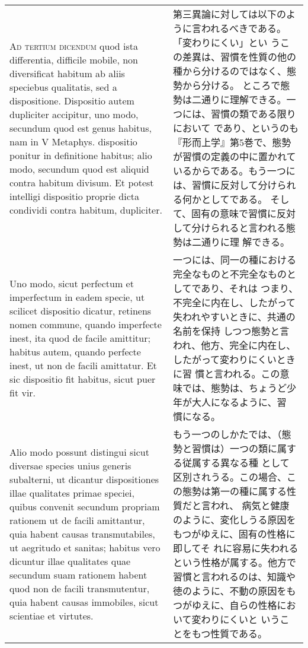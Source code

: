 \documentclass[10pt]{jsarticle} %
\begin{document}
\begin{longtable}{p{21em}p{21em}}
\\



{\scshape Ad tertium dicendum} quod ista differentia, difficile mobile, non
diversificat habitum ab aliis speciebus qualitatis, sed a
dispositione. Dispositio autem dupliciter accipitur, uno modo,
secundum quod est genus habitus, nam in V Metaphys. dispositio ponitur
in definitione habitus; alio modo, secundum quod est aliquid contra
habitum divisum. Et potest intelligi dispositio proprie dicta
condividi contra habitum, dupliciter. 


&

第三異論に対しては以下のように言われるべきである。「変わりにくい」とい
うこの差異は、習慣を性質の他の種から分けるのではなく、態勢から分ける。
ところで態勢は二通りに理解できる。一つには、習慣の類である限りにおいて
であり、というのも『形而上学』第5巻で、態勢が習慣の定義の中に置かれて
いるからである。もう一つには、習慣に反対して分けられる何かとしてである。
そして、固有の意味で習慣に反対して分けられると言われる態勢は二通りに理
解できる。

\\


Uno modo, sicut perfectum et
imperfectum in eadem specie, ut scilicet dispositio dicatur, retinens
nomen commune, quando imperfecte inest, ita quod de facile amittitur;
habitus autem, quando perfecte inest, ut non de facili amittatur. Et
sic dispositio fit habitus, sicut puer fit vir. 


&

一つには、同一の種における完全なものと不完全なものとしてであり、それは
つまり、不完全に内在し、したがって失われやすいときに、共通の名前を保持
しつつ態勢と言われ、他方、完全に内在し、したがって変わりにくいときに習
慣と言われる。この意味では、態勢は、ちょうど少年が大人になるように、習
慣になる。

\\

Alio modo possunt
distingui sicut diversae species unius generis subalterni, ut dicantur
dispositiones illae qualitates primae speciei, quibus convenit
secundum propriam rationem ut de facili amittantur, quia habent causas
transmutabiles, ut aegritudo et sanitas; habitus vero dicuntur illae
qualitates quae secundum suam rationem habent quod non de facili
transmutentur, quia habent causas immobiles, sicut scientiae et
virtutes. 


&

もう一つのしかたでは、（態勢と習慣は）一つの類に属する従属する異なる種
として区別されうる。この場合、この態勢は第一の種に属する性質だと言われ、
病気と健康のように、変化しうる原因をもつがゆえに、固有の性格に即してそ
れに容易に失われるという性格が属する。他方で習慣と言われるのは、知識や
徳のように、不動の原因をもつがゆえに、自らの性格において変わりにくいと
いうことをもつ性質である。


\end{longtable}
\end{document}
